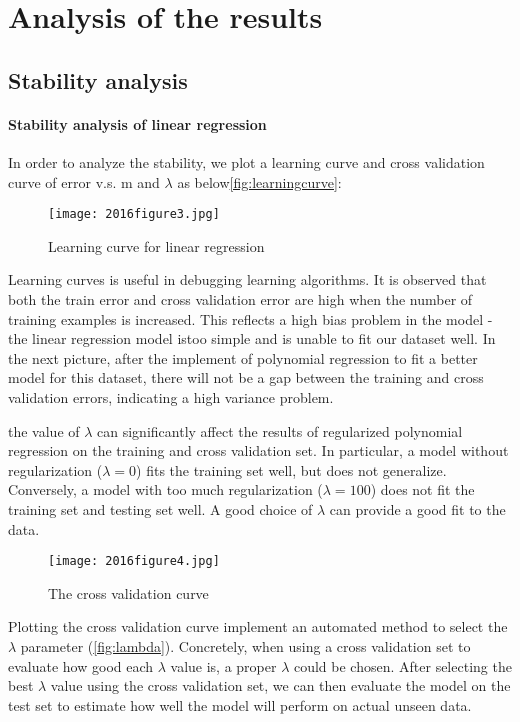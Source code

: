 

\section{Analysis of the results}
\subsection{Stability analysis}
\paragraph{Stability analysis of linear regression}

In order to analyze the stability, we plot a learning curve and cross validation curve of error v.s. m and $\lambda$ as below\autoref{fig:learningcurve}:

 \begin{figure}[h]
      \texttt{[image: 2016figure3.jpg]}
      \caption{Learning curve for linear regression}\label{fig:learningcurve}
 \end{figure}

Learning curves is useful in debugging learning algorithms. It is observed that both the train error and cross validation error are high when the number of training examples is increased. This reflects a high bias problem in the model - the linear regression model istoo simple and is unable to fit our dataset well. In the next picture, after the implement of polynomial regression to fit a better model for this dataset, there will not be a gap between the training and cross validation errors, indicating a high variance problem.

the value of $\lambda$ can significantly affect the results of regularized polynomial regression on the training and cross validation set. In particular, a model without regularization ($\lambda = 0$) fits the training set well, but does not generalize. Conversely, a model with too much regularization ($\lambda = 100$) does not fit the training set and testing set well. A good choice of $\lambda$ can provide a good fit to the data.
 \begin{figure}[h]
      \texttt{[image: 2016figure4.jpg]}
      \caption{The cross validation curve}\label{fig:lambda}
 \end{figure}

Plotting the cross validation curve implement an automated method to select the $\lambda$ parameter (\autoref{fig:lambda}). Concretely, when using a cross validation set to evaluate how good each $\lambda$ value is, a proper $\lambda$ could be chosen. After selecting the best $\lambda$ value using the cross validation set, we can then evaluate the model on the test set to estimate how well the model will perform on actual unseen data.

